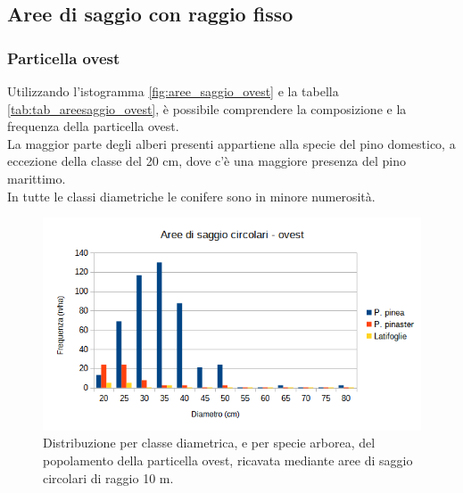 \subsection{Aree di saggio con raggio fisso}
\subsubsection*{Particella ovest}
Utilizzando l'istogramma \autoref{fig:aree_saggio_ovest} e la tabella \autoref{tab:tab_areesaggio_ovest}, è possibile comprendere la composizione e la frequenza della particella ovest.\\
La maggior parte degli alberi presenti appartiene alla specie del pino domestico, a eccezione della classe del 20 cm, dove c'è una maggiore presenza del pino marittimo.\\
In tutte le classi diametriche le conifere sono in minore numerosità.
\begin{figure}[H]
    \centering
    \includegraphics[width=0.7 \textwidth]{immagini/aree-saggio-ovest.png}
    \caption{Distribuzione per classe diametrica, e per specie arborea, del popolamento della particella ovest, ricavata mediante aree di saggio circolari di raggio 10 m. }
    \label{fig:aree_saggio_ovest}
\end{figure}

